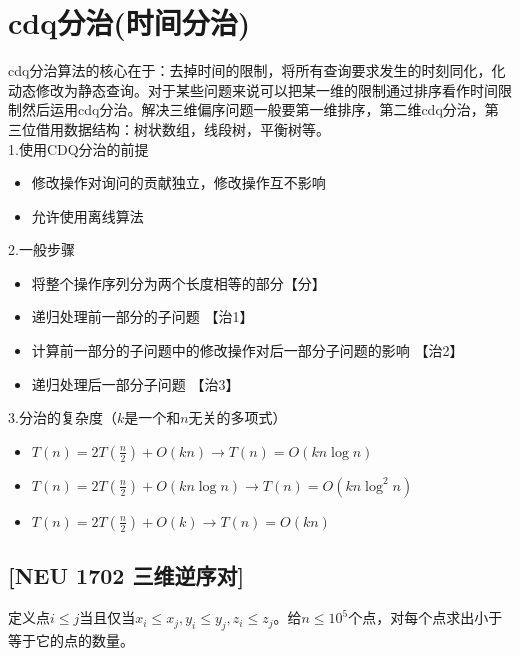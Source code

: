 \clearpage
\section{cdq分治(时间分治)}

cdq分治算法的核心在于：去掉时间的限制，将所有查询要求发生的时刻同化，化动态修改为静态查询。对于某些问题来说可以把某一维的限制通过排序看作时间限制然后运用cdq分治。解决三维偏序问题一般要第一维排序，第二维cdq分治，第三位借用数据结构：树状数组，线段树，平衡树等。\\
1.使用CDQ分治的前提
\begin{itemize}
\item 修改操作对询问的贡献独立，修改操作互不影响
\item 允许使用离线算法
\end{itemize}
2.一般步骤
\begin{itemize}
\item 将整个操作序列分为两个长度相等的部分【分】
\item 递归处理前一部分的子问题 【治1】
\item 计算前一部分的子问题中的修改操作对后一部分子问题的影响 【治2】
\item 递归处理后一部分子问题 【治3】
\end{itemize}
3.分治的复杂度（$k$是一个和$n$无关的多项式）
\begin{itemize}
\item $T(n)=2T(\frac{n}{2})+O(kn) \rightarrow T(n)=O(kn \log n)$
\item $T(n)=2T(\frac{n}{2})+O(kn\log n)\rightarrow T(n)=O(kn\log^{2} n)$
\item $T(n)=2T(\frac{n}{2})+O(k)\rightarrow T(n)=O(kn)$
\end{itemize}
\subsection{[NEU 1702 三维逆序对]}
定义点$i\leq j$当且仅当$x_{i}\leq x_{j},y_{i}\leq y_{j},z_{i}\leq z_{j}$。给$n\leq 10^5$个点，对每个点求出小于等于它的点的数量。

